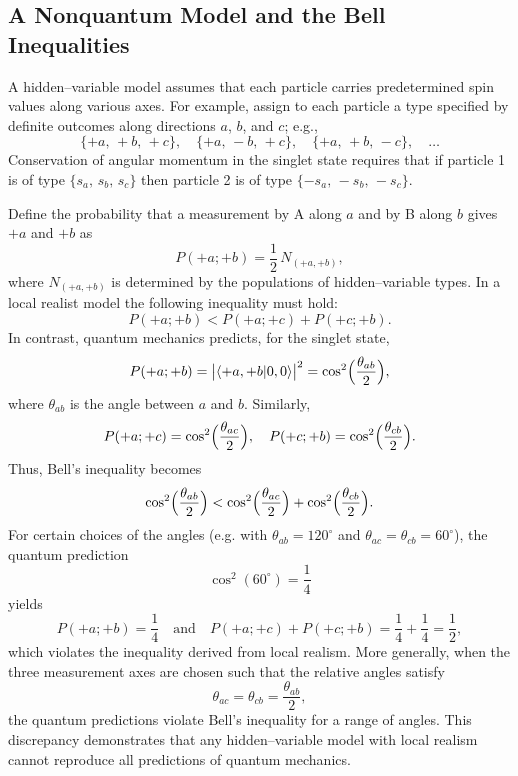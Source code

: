 \documentclass[twocolumn]{article}
\begin{document}
\begin{spacing}{1}
\subsection{A Nonquantum Model and the Bell Inequalities}
A hidden–variable model assumes that each particle carries predetermined spin values along various axes. For example, assign to each particle a type specified by definite outcomes along directions \(a\), \(b\), and \(c\); e.g.,
\[
\{+a,\,+b,\,+c\},\quad \{+a,\,-b,\,+c\},\quad \{+a,\,+b,\,-c\},\quad \ldots
\]
Conservation of angular momentum in the singlet state requires that if particle 1 is of type \(\{s_a,\,s_b,\,s_c\}\) then particle 2 is of type \(\{-s_a,\,-s_b,\,-s_c\}\).

Define the probability that a measurement by A along \(a\) and by B along \(b\) gives \(+a\) and \(+b\) as
\[
P(+a;+b)=\frac{1}{2}\,N_{(+a,+b)},
\]
where \(N_{(+a,+b)}\) is determined by the populations of hidden–variable types. In a local realist model the following inequality must hold:
\[
P(+a;+b) < P(+a;+c) + P(+c;+b).
\]
In contrast, quantum mechanics predicts, for the singlet state,
\[
P(+a;+b)=\bigl|\langle +a,+b|0,0\rangle\bigr|^2=\cos^2\Bigl(\frac{\theta_{ab}}{2}\Bigr),
\]
where \(\theta_{ab}\) is the angle between \(a\) and \(b\). Similarly,
\[
P(+a;+c)=\cos^2\Bigl(\frac{\theta_{ac}}{2}\Bigr),\quad P(+c;+b)=\cos^2\Bigl(\frac{\theta_{cb}}{2}\Bigr).
\]
Thus, Bell's inequality becomes
\[
\cos^2\Bigl(\frac{\theta_{ab}}{2}\Bigr) < \cos^2\Bigl(\frac{\theta_{ac}}{2}\Bigr) + \cos^2\Bigl(\frac{\theta_{cb}}{2}\Bigr).
\]
For certain choices of the angles (e.g. with \(\theta_{ab}=120^\circ\) and \(\theta_{ac}=\theta_{cb}=60^\circ\)), the quantum prediction
\[
\cos^2(60^\circ)=\frac{1}{4}
\]
yields
\[
P(+a;+b)=\frac{1}{4}\quad\text{and}\quad P(+a;+c)+P(+c;+b)=\frac{1}{4}+\frac{1}{4}=\frac{1}{2},
\]
which violates the inequality derived from local realism. More generally, when the three measurement axes are chosen such that the relative angles satisfy
\[
\theta_{ac}=\theta_{cb}=\frac{\theta_{ab}}{2},
\]
the quantum predictions violate Bell's inequality for a range of angles. This discrepancy demonstrates that any hidden–variable model with local realism cannot reproduce all predictions of quantum mechanics.



\end{spacing}
\end{document}
